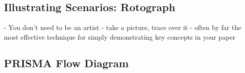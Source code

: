 







\newpage
\subsection{Illustrating Scenarios: Rotograph}

- You don't need to be an artist
- take a picture, trace over it
- often by far the most effective technique for simply demonstrating key concepts in your paper 




\newpage
\subsection{PRISMA Flow Diagram}


